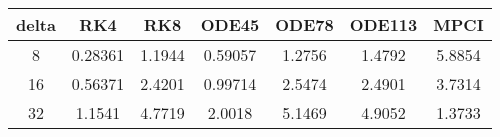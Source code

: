 \begin{tabular}{ccccccc}
\hline
delta & RK4 & RK8 & ODE45 & ODE78 & ODE113 & MPCI\\ 
\hline 
8 & 0.28361 & 1.1944 & 0.59057 & 1.2756 & 1.4792 & 5.8854\\ 
16 & 0.56371 & 2.4201 & 0.99714 & 2.5474 & 2.4901 & 3.7314\\ 
32 & 1.1541 & 4.7719 & 2.0018 & 5.1469 & 4.9052 & 1.3733\\ 
\hline 
\end{tabular}